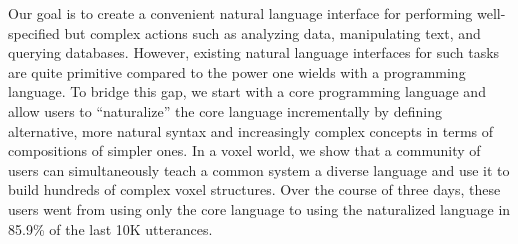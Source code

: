 Our goal is to create a convenient natural language interface for performing well-specified but complex actions such as analyzing data, manipulating text, and querying databases. However, existing natural language interfaces for such tasks are quite primitive compared to the power one wields with a programming language. To bridge this gap, we start with a core programming language and allow users to ``naturalize'' the core language incrementally by defining alternative, more natural syntax and increasingly complex concepts in terms of compositions of simpler ones. In a voxel world, we show that a community of users can simultaneously teach a common system a diverse language and use it to build hundreds of complex voxel structures. Over the course of three days, these users went from using only the core language to using the naturalized language in 85.9\% of the last 10K utterances.
